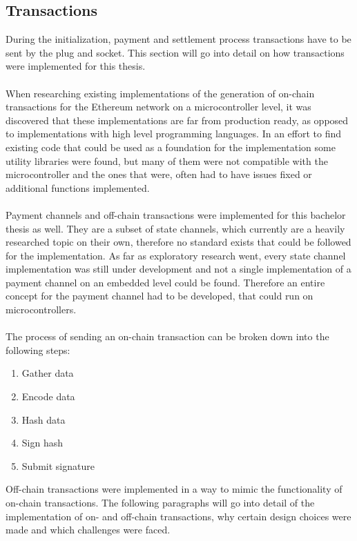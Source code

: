 \subsection{Transactions}
During the initialization, payment and settlement process transactions have to be sent by the plug and socket.
This section will go into detail on how transactions were implemented for this thesis.
\\\\
When researching existing implementations of the generation of on-chain transactions for the Ethereum network on a microcontroller level, it was discovered that these implementations are far from production ready, as opposed to implementations with high level programming languages.
In an effort to find existing code that could be used as a foundation for the implementation some utility libraries were found, but many of them were not compatible with the microcontroller and the ones that were, often had to have issues fixed or additional functions implemented.
\\\\
Payment channels and off-chain transactions were implemented for this bachelor thesis as well.
They are a subset of state channels, which currently are a heavily researched topic on their own, therefore no standard exists that could be followed for the implementation.
As far as exploratory research went, every state channel implementation was still under development and not a single implementation of a payment channel on an embedded level could be found\cite{state-channels}.
Therefore an entire concept for the payment channel had to be developed, that could run on microcontrollers.
\\\\
The process of sending an on-chain transaction can be broken down into the following steps: 
\begin{enumerate}
    \item Gather data
    \item Encode data
    \item Hash data
    \item Sign hash
    \item Submit signature
\end{enumerate}
Off-chain transactions were implemented in a way to mimic the functionality of on-chain transactions.
The following paragraphs will go into detail of the implementation of on- and off-chain transactions, why certain design choices were made and which challenges were faced.
\\\\\\
